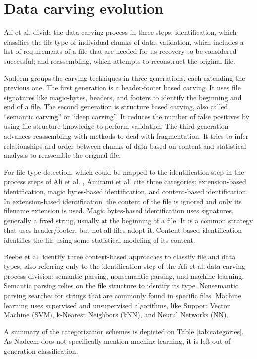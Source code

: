 \section{Data carving evolution}
Ali et al. \cite{ali_review_2018} divide the data carving process in three steps:
    identification, which classifies the file type of individual chunks of data; 
    validation, which includes a list of requirements of a file that are needed for its recovery to be considered successful; and
    reassembling, which attempts to reconstruct the original file.

Nadeem \cite{nadeem_ashraf_forensic_2013} groups the carving techniques in three generations, each extending the previous one.
The first generation is a header-footer based carving. It uses file signatures like magic-bytes, headers, and footers to identify the beginning and end of a file.
The second generation is structure based carving, also called ``semantic carving'' or ``deep carving''. It reduces the number of false positives by using file structure knowledge to perform validation.
The third generation advances reassembling with methods to deal with fragmentation. It tries to infer relationships and order between chunks of data based on content and statistical analysis to reassemble the original file.

For file type detection, which could be mapped to the identification step in the  process steps of Ali et al. \cite{ali_review_2018}, Amirami et al. \cite{amirani_new_2008} cite three categories: extension-based identification, magic bytes-based identification, and content-based identification.
In extension-based identification, the content of the file is ignored and only its filename extension is used. Magic bytes-based identification uses signatures, generally a fixed string, usually at the beginning of a file. It is a common strategy that uses header/footer, but not all files adopt it. Content-based identification identifies the file using some statistical modeling of its content.

Beebe et al. \cite{beebe_sceadan:_2013} identify three content-based approaches to classify file and data types, also referring only to the identification step of the Ali et al. \cite{ali_review_2018} data carving process division: semantic parsing, nonsemantic parsing, and machine learning. Semantic parsing relies on the file structure to identify its type. Nonsemantic parsing searches for strings that are commonly found in specific files. Machine learning uses supervised and unsupervised algorithms, like Support Vector Machine (SVM), k-Nearest Neighbors (kNN), and Neural Networks (NN).


A summary of the categorization schemes is depicted on Table \ref{tab:categories}. As Nadeem \cite{nadeem_ashraf_forensic_2013} does not specifically mention machine learning, it is left out of generation classification.


